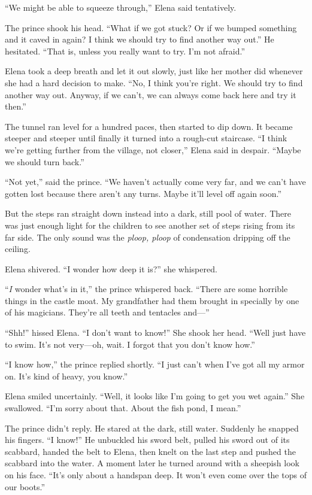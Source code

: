 \documentclass[10pt]{book}
\begin{document}
``We might be able to squeeze through,'' Elena said tentatively.

The prince shook his head. ``What if we got stuck? Or if we bumped something and it caved in again? I think we should try to find another way out.'' He hesitated. ``That is, unless you really want to try. I'm not afraid.''

Elena took a deep breath and let it out slowly, just like her mother did whenever she had a hard decision to make. ``No, I think you're right. We should try to find another way out. Anyway, if we can't, we can always come back here and try it then.''

The tunnel ran level for a hundred paces, then started to dip down. It became steeper and steeper until finally it turned into a rough-cut staircase. ``I think we're getting further from the village, not closer,'' Elena said in despair. ``Maybe we should turn back.''

``Not yet,'' said the prince. ``We haven't actually come very far, and we can't have gotten lost because there aren't any turns. Maybe it'll level off again soon.''

But the steps ran straight down instead into a dark, still pool of water. There was just enough light for the children to see another set of steps rising from its far side. The only sound was the \emph{ploop, ploop} of condensation dripping off the ceiling.

Elena shivered. ``I wonder how deep it is?'' she whispered.

``\emph{I} wonder what's in it,'' the prince whispered back. ``There are some horrible things in the castle moat. My grandfather had them brought in specially by one of his magicians. They're all teeth and tentacles and---''

``Shh!'' hissed Elena. ``I don't want to know!'' She shook her head. ``Well just have to swim. It's not very---oh, wait. I forgot that you don't know how.''

``I know how,'' the prince replied shortly. ``I just can't when I've got all my armor on. It's kind of heavy, you know.''

Elena smiled uncertainly. ``Well, it looks like I'm going to get you wet again.''  She swallowed. ``I'm sorry about that. About the fish pond, I mean.''

The prince didn't reply. He stared at the dark, still water. Suddenly he snapped his fingers. ``I know!'' He unbuckled his sword belt, pulled his sword out of its scabbard, handed the belt to Elena, then knelt on the last step and pushed the scabbard into the water. A moment later he turned around with a sheepish look on his face. ``It's only about a handspan deep. It won't even come over the tops of our boots.''
\end{document}
